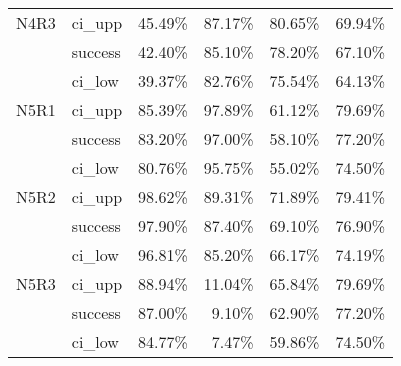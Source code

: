 \begin{tabular}{llrrrr}
N4R3 & ci\_upp &      45.49\% & 87.17\% &       80.65\% & 69.94\% \\
     & success &      42.40\% & 85.10\% &       78.20\% & 67.10\% \\
     & ci\_low &      39.37\% & 82.76\% &       75.54\% & 64.13\% \\
N5R1 & ci\_upp &      85.39\% & 97.89\% &       61.12\% & 79.69\% \\
     & success &      83.20\% & 97.00\% &       58.10\% & 77.20\% \\
     & ci\_low &      80.76\% & 95.75\% &       55.02\% & 74.50\% \\
N5R2 & ci\_upp &      98.62\% & 89.31\% &       71.89\% & 79.41\% \\
     & success &      97.90\% & 87.40\% &       69.10\% & 76.90\% \\
     & ci\_low &      96.81\% & 85.20\% &       66.17\% & 74.19\% \\
N5R3 & ci\_upp &      88.94\% & 11.04\% &       65.84\% & 79.69\% \\
     & success &      87.00\% &  9.10\% &       62.90\% & 77.20\% \\
     & ci\_low &      84.77\% &  7.47\% &       59.86\% & 74.50\% \\
\bottomrule
\end{tabular}

